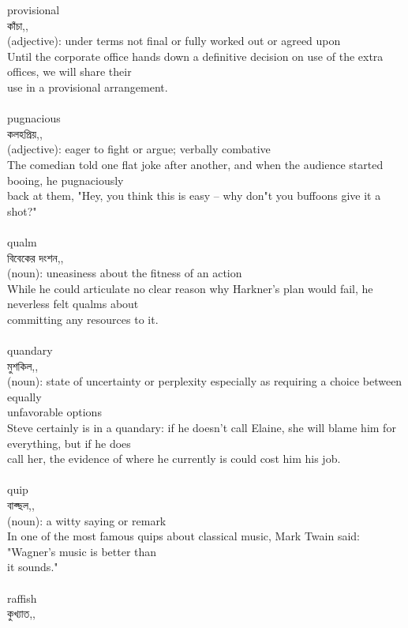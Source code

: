 \documentclass{article}
\begin{document}
{provisional}\\
{কাঁচা,,}\\
{(adjective): under terms not final or fully worked out or agreed upon\\Until the corporate office hands down a definitive decision on use of the extra offices, we will share their\\use in a provisional arrangement.\\}\\
{pugnacious}\\
{কলহপ্রিয়,,}\\
{(adjective): eager to fight or argue; verbally combative\\The comedian told one flat joke after another, and when the audience started booing, he pugnaciously\\back at them, "Hey, you think this is easy -- why don"t you buffoons give it a shot?"\\}\\
{qualm}\\
{বিবেকের দংশন,,}\\
{(noun): uneasiness about the fitness of an action\\While he could articulate no clear reason why Harkner's plan would fail, he neverless felt qualms about\\committing any resources to it.\\}\\
{quandary}\\
{মুশকিল,,}\\
{(noun): state of uncertainty or perplexity especially as requiring a choice between equally\\unfavorable options\\Steve certainly is in a quandary: if he doesn't call Elaine, she will blame him for everything, but if he does\\call her, the evidence of where he currently is could cost him his job.\\}\\
{quip}\\
{বাক্ছল,,}\\
{(noun): a witty saying or remark\\In one of the most famous quips about classical music, Mark Twain said: "Wagner's music is better than\\it sounds."\\}\\
{raffish}\\
{কুখ্যাত,,}\\
\end{document}
